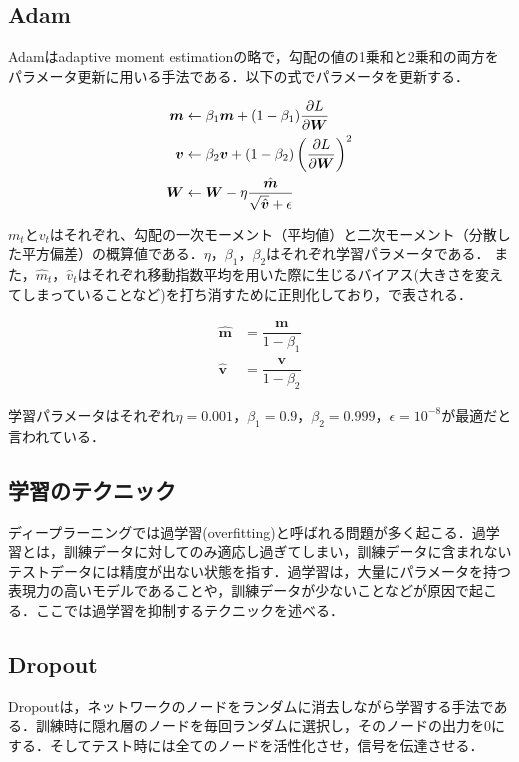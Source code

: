 \subsection*{Adam}
Adam\cite{Adam}はadaptive moment estimationの略で，勾配の値の1乗和と2乗和の両方をパラメータ更新に用いる手法である．以下の式でパラメータを更新する．

\begin{align}\label{eq:adam}
	\bm{m} & \leftarrow \beta_1 \bm{m} + (1 - \beta_1) \dfrac{\partial L}{\partial \bm{W}} \\
	\bm{v} & \leftarrow \beta_2 \bm{v} + (1 - \beta_2) \left( \dfrac{\partial L}{\partial \bm{W}} \right) ^2 \\
	\bm{W} & \leftarrow \bm{W} - \eta \dfrac{\hat{\bm{m}}}{\sqrt{\hat{\bm{v}}} + \epsilon} 
\end{align}

$m_t$と$v_t$はそれぞれ、勾配の一次モーメント（平均値）と二次モーメント（分散した平方偏差）の概算値である．$\eta$，$\beta_1$，$\beta_2$はそれぞれ学習パラメータである．
また，$\hat{m}_t$，$\hat{v}_t$はそれぞれ移動指数平均を用いた際に生じるバイアス(大きさを変えてしまっていることなど)を打ち消すために正則化しており，で表される．

\begin{align}\label{eq:adamhat}
	\hat{\bm{m}} & = \dfrac{\bm{m}}{1 - \beta_1} \\
	\hat{\bm{v}} & = \dfrac{\bm{v}}{1 - \beta_2}
\end{align}

学習パラメータはそれぞれ$\eta = 0.001$，$\beta_1 = 0.9$，$\beta_2 = 0.999$，$\epsilon = 10^{-8}$が最適だと言われている\cite{Adam}．

\subsection{学習のテクニック}
ディープラーニングでは過学習(overfitting)と呼ばれる問題が多く起こる．過学習とは，訓練データに対してのみ適応し過ぎてしまい，訓練データに含まれないテストデータには精度が出ない状態を指す．過学習は，大量にパラメータを持つ表現力の高いモデルであることや，訓練データが少ないことなどが原因で起こる．ここでは過学習を抑制するテクニックを述べる．
\subsection*{Dropout}
Dropout\cite{Dropout}は，ネットワークのノードをランダムに消去しながら学習する手法である．訓練時に隠れ層のノードを毎回ランダムに選択し，そのノードの出力を0にする．そしてテスト時には全てのノードを活性化させ，信号を伝達させる．


